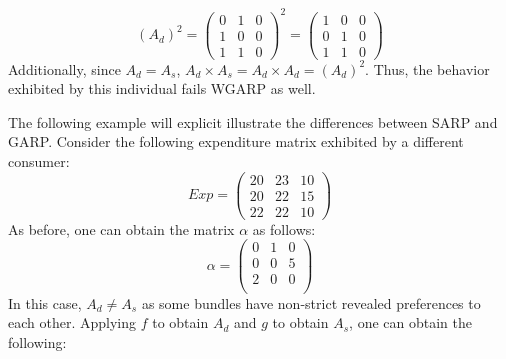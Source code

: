 \documentclass{article} %
\begin{document}
\[
(A_d)^2=\begin{pmatrix}
0 & 1 & 0\\
1 & 0 &0 \\
1 & 1 & 0
\end{pmatrix}^2 = \begin{pmatrix}
1&0&0\\
0&1&0\\
1&1&0
\end{pmatrix}\]
Additionally, since $A_d=A_s$, $A_d\times A_s=A_d\times A_d=(A_d)^2$. Thus, the behavior exhibited by this individual fails WGARP as well.

The following example will explicit illustrate the differences between SARP and GARP. Consider the following expenditure matrix exhibited by a different consumer:
\[Exp = \begin{pmatrix}
20 & 23 & 10\\
20 & 22 & 15\\
22 & 22 & 10
\end{pmatrix}
\]
As before, one can obtain the matrix $\alpha$ as follows:
\[
\alpha = \begin{pmatrix}
0 & 1 & 0 \\
0 & 0 & 5 \\
2 & 0 & 0 \\
\end{pmatrix}
\]
In this case, $A_d\not=A_s$ as some bundles have non-strict revealed preferences to each other. Applying $f$ to obtain $A_d$ and $g$ to obtain $A_s$, one can obtain the following:
\end{document}
